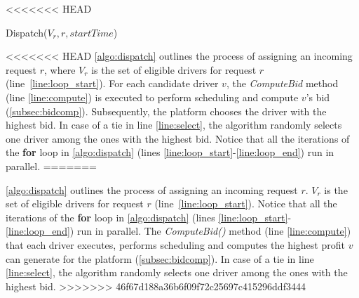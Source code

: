 \begin{algorithm}
<<<<<<< HEAD
\caption{Dispatch($V_r, r, startTime$)}
\label{algo:dispatch}
\end{algorithm}
<<<<<<< HEAD
\vspace{-3mm}
\cref{algo:dispatch} outlines the process of assigning an incoming request $r$, where $V_r$ is the set of eligible drivers for request $r$ (line~\ref{line:loop_start}). For each candidate driver $v$, the \emph{ComputeBid} method (line \ref{line:compute}) is executed to perform scheduling and compute $v$'s bid (\cref{subsec:bidcomp}). Subsequently, the platform chooses the driver with the highest bid. In case of a tie in line \ref{line:select}, the algorithm randomly selects one driver among the ones with the highest bid. Notice that all the iterations of the \textbf{for} loop in \cref{algo:dispatch} (lines \ref{line:loop_start}-\ref{line:loop_end}) run in parallel.
=======

\cref{algo:dispatch} outlines the process of assigning an incoming request $r$. $V_r$ is the set of eligible drivers for request $r$ (line~\ref{line:loop_start}). Notice that all the iterations of the \textbf{for} loop in \cref{algo:dispatch} (lines \ref{line:loop_start}-\ref{line:loop_end}) run in parallel. The \emph{ComputeBid()} method (line \ref{line:compute}) that each driver executes, performs scheduling and computes the highest profit $v$ can generate for the platform (\cref{subsec:bidcomp}). In case of a tie in line \ref{line:select}, the algorithm randomly selects one driver among the ones with the highest bid.
>>>>>>> 46f67d188a36b6f09f72c25697c415296ddf3444

